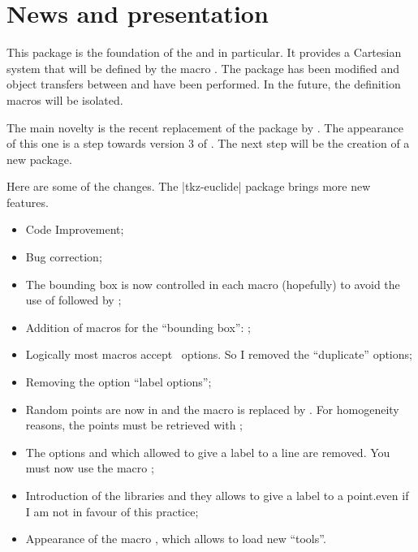 \section{News and presentation}

This package is the foundation of the  and
 in particular. It provides a Cartesian system that will be
defined by the macro . The package has been modified and
object transfers between  and  have been
performed.
In the future, the definition macros will be isolated.

The main novelty is the recent replacement of the  package by
. The appearance of this one is a step towards version 3 of \LATEX.
The next step will be the creation of a new package.

Here are some of the changes. The |tkz-euclide| package brings more new
features.
\vspace{2cm}
\begin{itemize}\setlength{\itemsep}{10pt}
\item Code Improvement;
\item Bug correction;
\item The bounding box is now controlled in each macro (hopefully) to avoid the
use of  followed by ;
\item Addition of macros for the  \enquote{bounding box}: 
;
\item Logically most macros accept \TIKZ\ options. So I removed the \enquote{duplicate} options;
\item Removing the option \enquote{label options};
\item Random points are now in  and the macro
 is replaced by . For
homogeneity reasons, the points must be retrieved with ;
\item The options  and  which allowed to give a label
to a line are removed. You must now use the macro ;

\item Introduction of the libraries  and  they
allows to give a label to a point.even if I am not in favour of this practice;

\item Appearance of the macro , which allows to load new \enquote{tools}.
\end{itemize}

\endinput
